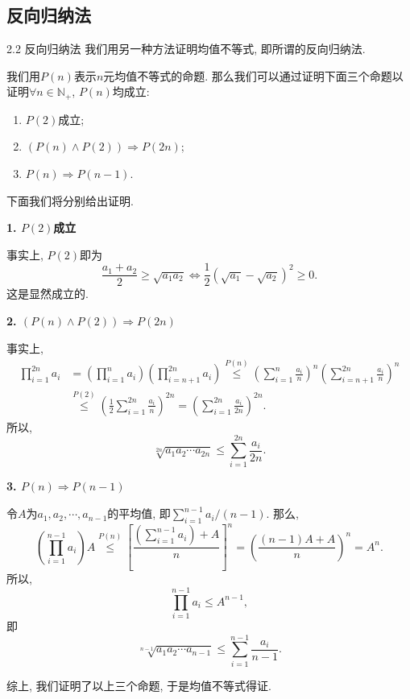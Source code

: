 \documentclass[serif]{beamer}
\begin{document}
\subsection{\kaishu 反向归纳法}

\begin{frame}{2.2 反向归纳法}
	我们用另一种方法证明均值不等式, 即所谓的反向归纳法.\par
	我们用$P(n)$表示$n$元均值不等式的命题. 那么我们可以通过证明下面三个命题以证明$\forall n\in\mathbb{N}_+$, $P(n)$均成立:{\kaishu
	\begin{enumerate}
		\item $P(2)$成立;
		\item $(P(n)\wedge P(2))\Rightarrow P(2n)$;
		\item $P(n)\Rightarrow P(n-1)$.
	\end{enumerate}
	}
	下面我们将分别给出证明.
\end{frame}

\begin{frame}
	\textbf{1. $P(2)$成立}\par
	事实上, $P(2)$即为
	\[\frac{a_1+a_2}{2}\ge\sqrt{a_1a_2}\Leftrightarrow\frac{1}{2}(\sqrt{a_1}-\sqrt{a_2})^2\ge0.\]
	这是显然成立的.\par
	\textbf{2. $(P(n)\wedge P(2))\Rightarrow P(2n)$}\par
	事实上,
	\begin{align*}
		\prod\limits_{i=1}^{2n}{a_i}&=\left(\prod\limits_{i=1}^{n}{a_i}\right)\left(\prod\limits_{i=n+1}^{2n}{a_i}\right)\overset{P(n)}{\le}\left(\sum\limits_{i=1}^{n}\frac{a_i}{n}\right)^n\left(\sum\limits_{i=n+1}^{2n}\frac{a_i}{n}\right)^n\\
		&\overset{P(2)}{\le}\left(\frac{1}{2}\sum\limits_{i=1}^{2n}\frac{a_i}{n}\right)^{2n}=\left(\sum\limits_{i=1}^{2n}\frac{a_i}{2n}\right)^{2n}.
	\end{align*}
	所以, 
	\[\sqrt[2n]{a_1a_2\cdots a_{2n}}\le\sum\limits_{i=1}^{2n}\frac{a_i}{2n}.\]
\end{frame}

\begin{frame}
	\textbf{3. $P(n)\Rightarrow P(n-1)$}\par
	令$A$为$a_1,a_2,\cdots,a_{n-1}$的平均值, 即$\sum_{i=1}^{n-1}a_i/(n-1)$. 那么,
	\[\left(\prod\limits_{i=1}^{n-1}a_i\right)A\overset{P(n)}{\le}\left[\frac{\left(\sum_{i=1}^{n-1}a_i\right)+A}{n}\right]^n=\left(\frac{(n-1)A+A}{n}\right)^n=A^n.\]
	所以, 
	\[\prod\limits_{i=1}^{n-1}a_i\le A^{n-1},\]
	即
	\[\sqrt[n-1]{a_1a_2\cdots a_{n-1}}\le\sum\limits_{i=1}^{n-1}\frac{a_i}{n-1}.\]\par
	综上, 我们证明了以上三个命题, 于是均值不等式得证.
\end{frame}
\end{document}
